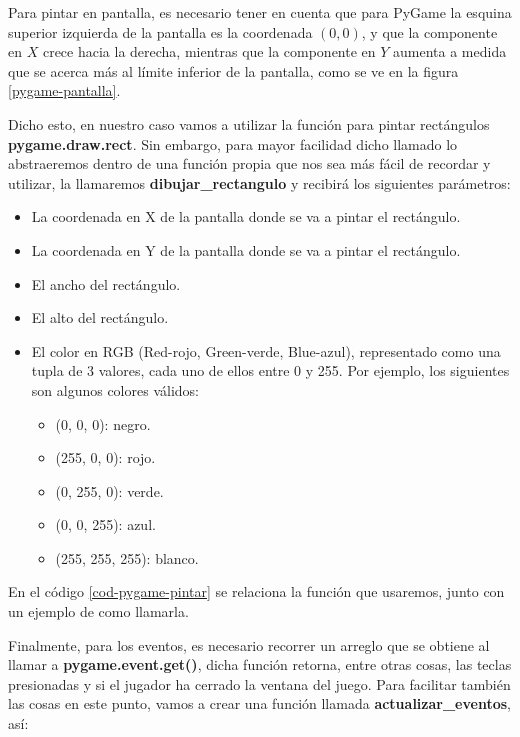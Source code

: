 Para pintar en pantalla, es necesario tener en cuenta que para PyGame la esquina superior izquierda de la pantalla es la coordenada $(0,0)$, y que la componente en $X$ crece hacia la derecha, mientras que la componente en $Y$ aumenta a medida que se acerca más al límite inferior de la pantalla, como se ve en la figura \ref{pygame-pantalla}.

Dicho esto, en nuestro caso vamos a utilizar la función para pintar rectángulos \textbf{pygame.draw.rect}. Sin embargo, para mayor facilidad dicho llamado lo abstraeremos dentro de una función propia que nos sea más fácil de recordar y utilizar, la llamaremos \textbf{dibujar\_rectangulo} y recibirá los siguientes parámetros:

\begin{itemize}
	\item La coordenada en X de la pantalla donde se va a pintar el rectángulo.
	\item La coordenada en Y de la pantalla donde se va a pintar el rectángulo.
	\item El ancho del rectángulo.
	\item El alto del rectángulo.
	\item El color en RGB (Red-rojo, Green-verde, Blue-azul), representado como una tupla de 3 valores, cada uno de ellos entre 0 y 255. Por ejemplo, los siguientes son algunos colores válidos:
	\begin{itemize}
		\item (0, 0, 0): negro.
		\item (255, 0, 0): rojo.
		\item (0, 255, 0): verde.
		\item (0, 0, 255): azul.
		\item (255, 255, 255): blanco.
	\end{itemize}
\end{itemize}

En el código \ref{cod-pygame-pintar} se relaciona la función que usaremos, junto con un ejemplo de como llamarla.



Finalmente, para los eventos, es necesario recorrer un arreglo que se obtiene al llamar a \textbf{pygame.event.get()}, dicha función retorna, entre otras cosas, las teclas presionadas y si el jugador ha cerrado la ventana del juego. Para facilitar también las cosas en este punto, vamos a crear una función llamada \textbf{actualizar\_eventos}, así:

